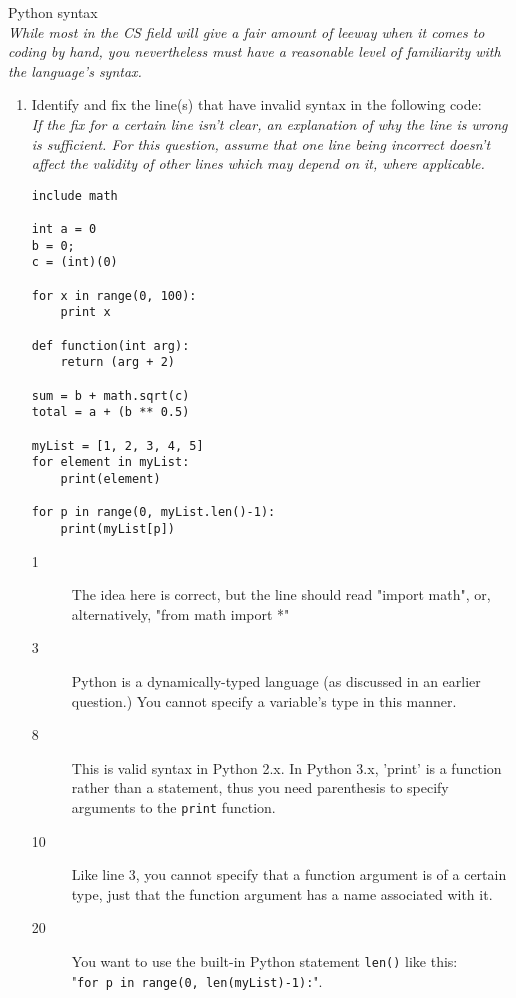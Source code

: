 Python syntax\\
\emph{While most in the CS field will give a fair amount of leeway when it comes to coding by hand,
you nevertheless must have a reasonable level of familiarity with the language's syntax.}

\begin{enumerate}
\item Identify and fix the line(s) that have invalid syntax in the following code:\\
\emph{If the fix for a certain line isn't clear, an explanation of why the line is wrong is sufficient. For this question, assume that one line being incorrect doesn't affect the validity of other lines which may depend on it, where applicable.}
\begin{lstlisting}
include math

int a = 0
b = 0;
c = (int)(0)

for x in range(0, 100):
	print x

def function(int arg):
	return (arg + 2)

sum = b + math.sqrt(c)
total = a + (b ** 0.5)

myList = [1, 2, 3, 4, 5]
for element in myList:
	print(element)

for p in range(0, myList.len()-1):
	print(myList[p])
\end{lstlisting}
\begin{answer}
\begin{description}
	\item[1] The idea here is correct, but the line should read "import math", or, alternatively, "from math import *"
	\item[3] Python is a dynamically-typed language (as discussed in an earlier question.) You cannot specify a variable's type in this manner.
	\item[8] This is valid syntax in Python 2.x. In Python 3.x, 'print' is a function rather than a statement, thus you need parenthesis to specify arguments to the \texttt{print} function.
	\item[10] Like line 3, you cannot specify that a function argument is of a certain type, just that the function argument has a name associated with it.
	\item[20] You want to use the built-in Python statement \texttt{len()} like this:\\
	 "\texttt{for p in range(0, len(myList)-1):}".


\end{description}
\end{answer}


\end{enumerate}
